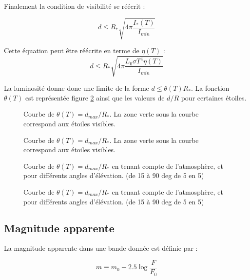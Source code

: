 \documentclass[11pt]{article} %
\begin{document}
Finalement la condition de visibilité se réécrit :

\begin{equation}
 d \leq R_{*} \sqrt{4\pi\dfrac{I_*(T)}{I_{min}}}
\end{equation}

Cette équation peut être réécrite en terme de $\eta(T)$ :
\begin{equation}
 d \leq R_{*} \sqrt{4\pi\dfrac{L_0 \sigma T^4 \eta(T)}{I_{min}}}
\end{equation}

La luminosité donne donc une limite de la forme $d \leq \theta (T) R_*$. La fonction $\theta(T)$ est représentée figure \ref{fig:theta} ainsi que les valeurs de $d/R$ pour certaines étoiles. 

\begin{figure}[H]
\centering
  \caption{Courbe de $\theta(T) =  d_{max}/R_*$. La zone verte sous la courbe correspond aux étoiles visibles.  
\label{fig:theta}}

\end{figure}


\begin{figure}[H]
\centering
  \caption{Courbe de $\theta(T) =  d_{max}/R_* $. La zone verte sous la courbe correspond aux étoiles visibles.  
\label{fig:theta}}

\end{figure}

\begin{figure}[H]
\centering
  \caption{Courbe de $\theta(T) =  d_{max}/R_* $ en tenant compte de l'atmosphère, et pour différents angles d'élévation. (de 15 à 90 deg de 5 en 5)
\label{fig:theta_atmosphere}}

\end{figure}

\begin{figure}[H]
\centering
  \caption{Courbe de $\theta(T) =  d_{max}/R_* $ en tenant compte de l'atmosphère, et pour différents angles d'élévation. (de 15 à 90 deg de 5 en 5)
\label{fig:theta_high_atmosphere}}

\end{figure}

\subsection{Magnitude apparente}

La magnitude apparente dans une bande donnée est définie par :

\begin{equation}
m \equiv m_0 - 2.5 \log \dfrac{F}{F_0}
\end{equation}
\end{document}
